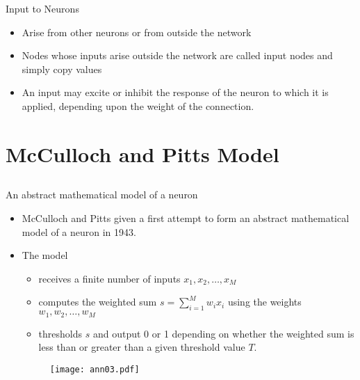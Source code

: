 \begin{frame}{Input to Neurons}
\begin{itemize}
\item Arise from other neurons or from outside the network
\item Nodes whose inputs arise outside the network are called input nodes and simply copy values
\item An input may excite or inhibit the response of the neuron to which it is applied, depending upon the weight of the connection.
\end{itemize}
\end{frame}


\section{McCulloch and Pitts Model}
\subsection{}
\begin{frame}{An abstract mathematical model of a neuron}
\begin{itemize}
\item McCulloch and Pitts given a first attempt to form an abstract mathematical model of a neuron in 1943.
\item The model 
\begin{itemize}
\setlength{\itemsep}{5pt}
\item receives a finite number of inputs $x_1,x_2,\ldots,x_M$
\item computes the weighted sum $s = \sum\nolimits_{i = 1}^M {{w_i}{x_i}}$ using the weights $w_1,w_2,\ldots,w_M$
\item thresholds $s$ and output 0 or 1 depending on whether the weighted sum is less than or greater than a given threshold value $T$.
\end{itemize}
\begin{figure}
\texttt{[image: ann03.pdf]}
\end{figure}
\end{itemize}
\end{frame}

